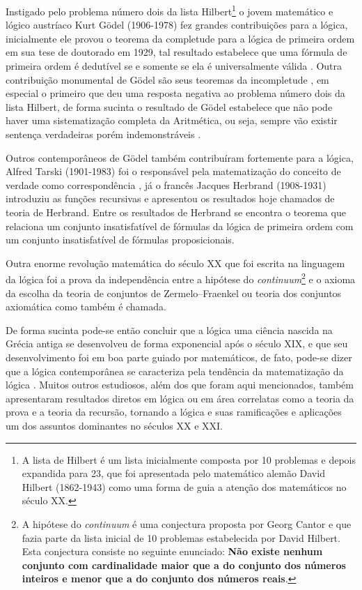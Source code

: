 Instigado pelo problema número dois da lista Hilbert\footnote{A lista de Hilbert é um lista inicialmente composta por 10 problemas e depois expandida para 23, que foi apresentada pelo matemático alemão David Hilbert (1862-1943) como uma forma de guia a atenção dos matemáticos no século XX.} o jovem matemático e lógico austríaco Kurt Gödel (1906-1978) fez grandes contribuições para a lógica, inicialmente ele provou o teorema da completude para a lógica de primeira ordem em sua tese de doutorado em 1929, tal resultado estabelece que uma fórmula de primeira ordem é dedutível se e somente se ela é universalmente válida \cite{BenjaV1}. Outra contribuição monumental de Gödel são seus teoremas da incompletude \cite{godel1931}, em especial o primeiro que deu uma resposta negativa ao problema número dois da lista Hilbert, de forma sucinta o resultado de Gödel estabelece que não pode haver uma sistematização completa da Aritmética, ou seja, sempre vão existir sentença verdadeiras porém indemonstráveis \cite{abe2002-logica}.

Outros contemporâneos de Gödel também contribuíram fortemente para a lógica, Alfred Tarski (1901-1983) foi o responsável pela matematização do conceito de verdade como correspondência \cite{abe2002-logica, tarski1983}, já o francês Jacques Herbrand (1908-1931) introduziu as funções recursivas e apresentou os resultados hoje chamados de teoria de Herbrand. Entre os resultados de Herbrand se encontra o teorema que relaciona um conjunto insatisfatível de fórmulas da lógica de primeira ordem com um conjunto insatisfatível de fórmulas proposicionais.

Outra enorme revolução matemática do século XX que foi escrita na linguagem da lógica foi a prova da independência entre a hipótese do \textit{continuum}\footnote{A hipótese do \textit{continuum} é uma conjectura proposta por Georg Cantor e que fazia parte da lista inicial de 10 problemas estabelecida por David Hilbert. Esta conjectura consiste no seguinte enunciado: \textbf{Não existe nenhum conjunto com cardinalidade maior que a do conjunto dos números inteiros e menor que a do conjunto dos números reais}.} e o axioma da escolha da teoria de conjuntos de Zermelo–Fraenkel ou teoria dos conjuntos axiomática como também é chamada.

De forma sucinta pode-se então concluir que a lógica uma ciência nascida na Grécia antiga se desenvolveu de forma exponencial após o século XIX, e que seu desenvolvimento foi em boa parte guiado por matemáticos, de fato, pode-se dizer que a lógica contemporânea se caracteriza pela tendência da matematização da lógica \cite{barreto1998}. Muitos outros estudiosos, além dos que foram aqui mencionados, também apresentaram resultados diretos em lógica ou em área correlatas como a teoria da prova e a teoria da recursão, tornando a lógica e suas ramificações e aplicações um dos assuntos dominantes no séculos XX e XXI. 


